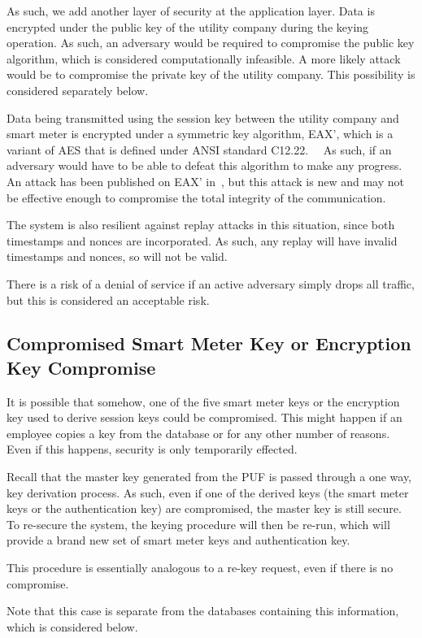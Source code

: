 As such, we add another layer of security at the application layer. Data is encrypted under the public key of the utility
company during the keying operation. As such, an adversary would be required to compromise the public key
algorithm, which is considered computationally infeasible. A more likely attack would be to compromise the private key
of the utility company. This possibility is considered separately below.

Data being transmitted using the session key between the utility company and smart meter is encrypted under a
symmetric key algorithm, EAX', which is a variant of AES that is defined under ANSI standard 
C12.22.~\cite{ansi1222}~\cite{eax} As such, if an adversary would have to be able to defeat this algorithm to make
any progress. An attack has been published on EAX' in~\cite{eaxflaw}, but this attack is new and may not be effective
enough to compromise the total integrity of the communication.

The system is also resilient against replay attacks in this situation, since both timestamps and nonces are incorporated.
As such, any replay will have invalid timestamps and nonces, so will not be valid.

There is a risk of a denial of service if an active adversary simply drops all traffic, but this is considered an acceptable
risk.

\subsection{Compromised Smart Meter Key or Encryption Key Compromise}
It is possible that somehow, one of the five smart meter keys or the encryption key used to derive session keys
could be compromised. This might happen if an employee copies a key from the database or for any other number
of reasons. Even if this happens, security is only temporarily effected.

Recall that the master key generated from the PUF is passed through a one way, key derivation process. As such,
even if one of the derived keys (the smart meter keys or the authentication key) are compromised, the master key
is still secure. To re-secure the system, the keying procedure will then be re-run, which will provide a brand new set
of smart meter keys and authentication key.

This procedure is essentially analogous to a re-key request, even if there is no compromise.

Note that this case is separate from the databases containing this information, which is considered below.

